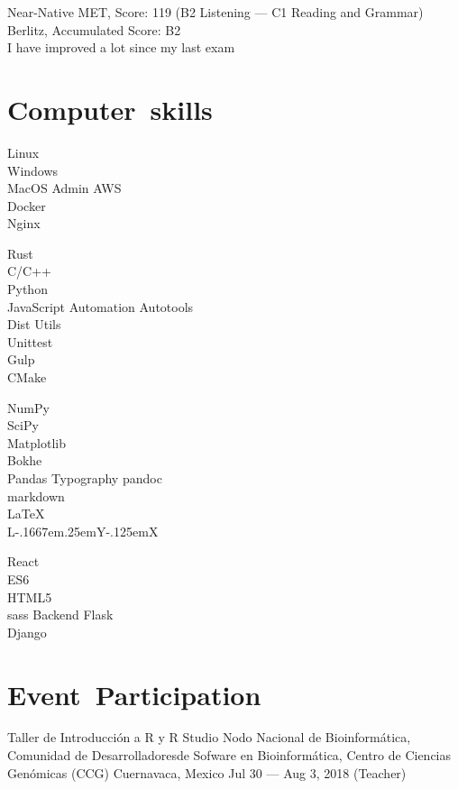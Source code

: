 \documentclass[12pt,english]{moderncv}
\makeatletter
\providecommand{\LyX}{\texorpdfstring%
  {L\kern-.1667em\lower.25em\hbox{Y}\kern-.125emX\@}
  {LyX}}
\makeatother
\begin{document}
           {Near-Native}
           {%
               MET, Score: 119 (B2 Listening --- C1 Reading and Grammar)\\
               Berlitz, Accumulated Score: B2\\
               I have improved a lot since my last exam
           }

\section{Computer~skills}

            {Linux\\Windows\\MacOS}
           {Admin}         {AWS\\Docker\\Nginx}

   {Rust\\C/C++\\Python\\JavaScript}
           {Automation}    {Autotools\\Dist Utils\\Unittest\\Gulp\\CMake}

    {NumPy\\SciPy\\Matplotlib\\Bokhe\\Pandas}
           {Typography}    {pandoc\\markdown\\\LaTeX{}\\\LyX{}}


    {React\\ES6\\HTML5\\sass}
           {Backend}       {Flask\\Django}


\section{Event~Participation}

        {Taller de Introducción a R y R Studio}
        {%
            Nodo Nacional de Bioinformática, Comunidad de Desarrolladoresde
            Sofware en Bioinformática, Centro de Ciencias Genómicas (CCG)
        }
        {Cuernavaca, Mexico}
        {Jul 30 --- Aug 3, 2018}
        {(Teacher)}
\end{document}
